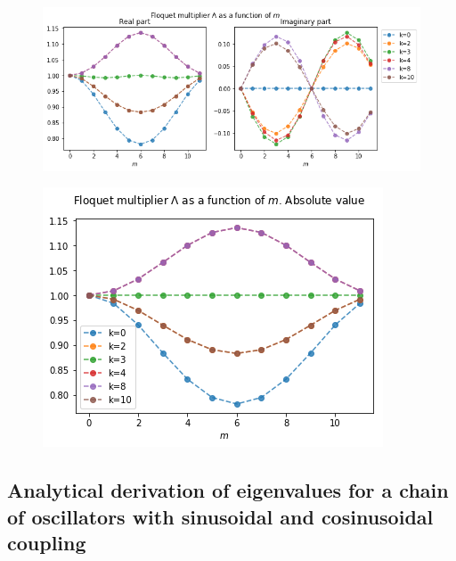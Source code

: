 \documentclass[a4paper,12pt]{article}
\begin{document}
\begin{itemize}
\begin{figure}[h]
    \centering
    \includegraphics[width=.95\textwidth]{assets/theory-2019-08-27-181703429-803.png}
\end{figure}

\begin{figure}[h]
    \centering
    \includegraphics[width=.55\textwidth]{assets/theory-2019-08-27-182315374-a22.png}
\end{figure}

\clearpage

\begin{appendices}

\section{Analytical derivation of eigenvalues for a chain of oscillators with sinusoidal and cosinusoidal coupling} 
 

\end{appendices}
\end{itemize}
\end{document}
